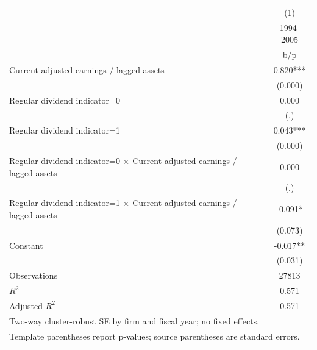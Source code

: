 {
\def\sym#1{\ifmmode^{#1}\else\(^{#1}\)\fi}
\begin{tabular}{l*{1}{c}}
\hline\hline
                    &\multicolumn{1}{c}{(1)}\\
                    &\multicolumn{1}{c}{1994-2005}\\
                    &         b/p   \\
\hline
Current adjusted earnings / lagged assets&       0.820***\\
                    &     (0.000)   \\
Regular dividend indicator=0&       0.000   \\
                    &         (.)   \\
Regular dividend indicator=1&       0.043***\\
                    &     (0.000)   \\
Regular dividend indicator=0 $\times$ Current adjusted earnings / lagged assets&       0.000   \\
                    &         (.)   \\
Regular dividend indicator=1 $\times$ Current adjusted earnings / lagged assets&      -0.091*  \\
                    &     (0.073)   \\
Constant            &      -0.017** \\
                    &     (0.031)   \\
\hline
Observations        &       27813   \\
\(R^{2}\)           &       0.571   \\
Adjusted \(R^{2}\)  &       0.571   \\
\hline\hline
\multicolumn{2}{l}{\footnotesize Two-way cluster-robust SE by firm and fiscal year; no fixed effects.}\\
\multicolumn{2}{l}{\footnotesize Template parentheses report p-values; source parentheses are standard errors.}\\
\end{tabular}
}
